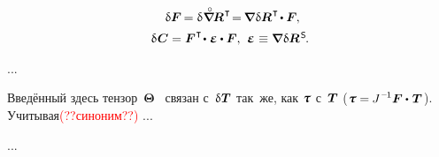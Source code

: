\begin{otherlanguage}{russian}
\begin{equation}
\begin{array}{c}
\:\,
\variation{\bm{F}} \hspace{-0.2ex} = \variation{\hspace{.1ex} \boldnablacircled \hspace{-0.16ex} \bm{R}^{\hspace{0.12ex}\T}} \hspace{-0.4ex}
= \hspace{-0.2ex} \boldnabla \hspace{.1ex} \variation{\bm{R}}^{\hspace{0.12ex}\T} \hspace{-0.25ex} \dotp \bm{F} \hspace{-0.1ex},
\\[.5em]
%
\variation{\hspace{.12ex}\bm{C}} = \bm{F}^{\hspace{.1ex}\T} \hspace{-0.32ex} \dotp \hspace{.1ex} \mathboldepsilon \dotp \bm{F} ,
\:\,
\mathboldepsilon \hspace{0.1ex} \equiv \boldnabla \hspace{.1ex} \variation{\bm{R}}^{\hspace{0.2ex}\mathsf{S}} \hspace{-0.2ex} .
\end{array}
\end{equation}

...

Введённый здесь тензор~$\bm{\Theta}$~\cite{lurie-nonlinearelasticity} связан с~$\variation{\hspace{.1ex}\firstpiolakirchhoffstress}$ так~же, как $\cauchystress$ с~$\bm{T}$ (${\cauchystress = \hspace{-0.1ex} J^{\hspace{.12ex}\expminusone} \bm{F} \dotp \hspace{.16ex} \firstpiolakirchhoffstress\hspace{.2ex}}$). Учитывая\textcolor{red}{(??синоним??)} ...

...



\end{otherlanguage}



